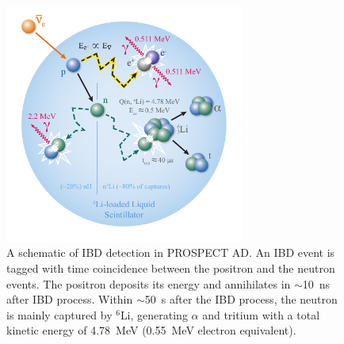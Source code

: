 \begin{figure}[h]
    \centering
    \includegraphics[width=0.7\textwidth]{Figures/IBDSchematic.pdf}
    \caption[IBD detection schematic]{A schematic of IBD detection in PROSPECT AD.
	An IBD event is tagged with time coincidence between the positron and the neutron events.
	The positron deposits its energy and annihilates in $\sim$10~ns after IBD process.
	Within $\sim$50~\textmu s after the IBD process, the neutron is mainly captured by $^6$Li, generating $\alpha$ and tritium with a total kinetic energy of 4.78~MeV (0.55~MeV electron equivalent).}
    \label{fig:IBDscheme}
\end{figure}

